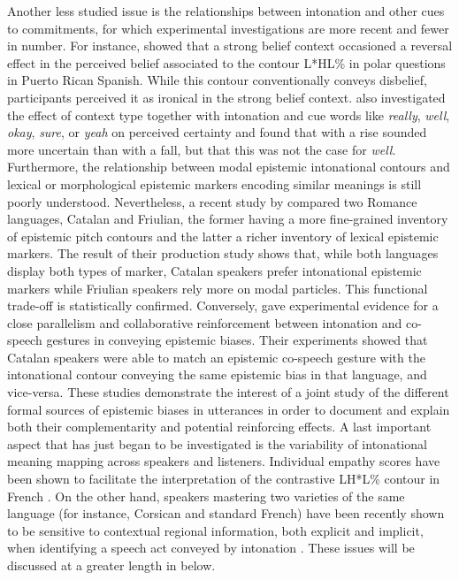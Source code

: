 \documentclass[output=paper,colorlinks,citecolor=brown]{langscibook}
\begin{document}
Another less studied issue is the relationships between intonation and other cues to commitments, for which experimental investigations are more recent and fewer in number. For instance, \citet{armstrong2015contribution} showed that a strong belief context occasioned a reversal effect in the perceived belief associated to the contour L*HL\% in polar questions in Puerto Rican Spanish. While this contour conventionally conveys disbelief, participants perceived it as ironical in the strong belief context. \citet{Lai2010} also investigated the effect of context type together with intonation and cue words like \textit{really}, \textit{well}, \textit{okay}, \textit{sure}, or \textit{yeah} on perceived certainty and found that  with a rise sounded more uncertain than with a fall, but that this was not the case for \textit{well}. Furthermore, the relationship between modal epistemic intonational contours and lexical or morphological epistemic markers encoding similar meanings is still poorly understood. Nevertheless, a recent study by \citet{Prieto+2021} compared two Romance languages, Catalan and Friulian, the former having a more fine-grained inventory of epistemic pitch contours and the latter a richer inventory of lexical epistemic markers. The result of their production study shows that, while both languages display both types of marker, Catalan speakers prefer intonational epistemic markers while Friulian speakers rely more on modal particles. This functional trade-off is statistically confirmed. Conversely, \citet{BorKiaPrieto2019} gave experimental evidence for a close parallelism and collaborative reinforcement between intonation and co-speech gestures in conveying epistemic biases. Their experiments showed that Catalan speakers were able to match an epistemic co-speech gesture with the intonational contour conveying the same epistemic bias in that language, and vice-versa. These studies demonstrate the interest of a joint study of the different formal sources of epistemic biases in utterances in order to document and explain both their complementarity and potential reinforcing effects. A last important aspect that has just began to be investigated is the variability of intonational meaning mapping across speakers and listeners. Individual empathy scores have been shown to facilitate the interpretation of the contrastive LH*L\% contour in French \citep{esteveetal2020}. On the other hand, speakers mastering two varieties of the same language (for instance, Corsican and standard French) have been recently shown to be sensitive to contextual regional information, both explicit and implicit, when identifying a speech act conveyed by intonation \citep{warren2017, germanportes2020, portesgerman2019}. These issues will be discussed at a greater length in  below.
\end{document}
